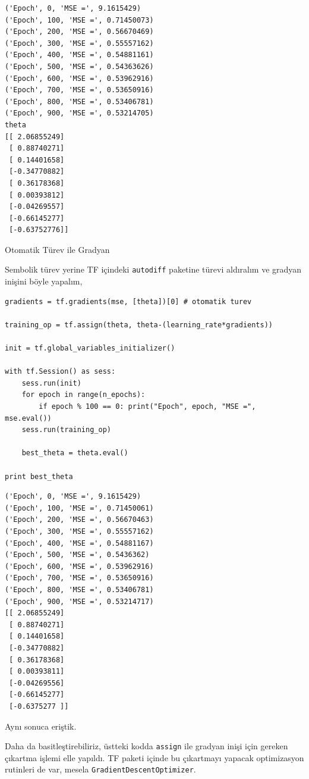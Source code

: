 \documentclass[12pt,fleqn]{article}\usepackage{../../common}
\begin{document}
\begin{verbatim}
('Epoch', 0, 'MSE =', 9.1615429)
('Epoch', 100, 'MSE =', 0.71450073)
('Epoch', 200, 'MSE =', 0.56670469)
('Epoch', 300, 'MSE =', 0.55557162)
('Epoch', 400, 'MSE =', 0.54881161)
('Epoch', 500, 'MSE =', 0.54363626)
('Epoch', 600, 'MSE =', 0.53962916)
('Epoch', 700, 'MSE =', 0.53650916)
('Epoch', 800, 'MSE =', 0.53406781)
('Epoch', 900, 'MSE =', 0.53214705)
theta
[[ 2.06855249]
 [ 0.88740271]
 [ 0.14401658]
 [-0.34770882]
 [ 0.36178368]
 [ 0.00393812]
 [-0.04269557]
 [-0.66145277]
 [-0.63752776]]
\end{verbatim}

Otomatik Türev ile Gradyan

Sembolik türev yerine TF içindeki \verb!autodiff! paketine türevi aldıralım
ve gradyan inişini böyle yapalım,

\begin{verbatim}
gradients = tf.gradients(mse, [theta])[0] # otomatik turev

training_op = tf.assign(theta, theta-(learning_rate*gradients))

init = tf.global_variables_initializer()

with tf.Session() as sess:
    sess.run(init)
    for epoch in range(n_epochs):
        if epoch % 100 == 0: print("Epoch", epoch, "MSE =", mse.eval())
	sess.run(training_op)
    
    best_theta = theta.eval()
    
print best_theta
\end{verbatim}

\begin{verbatim}
('Epoch', 0, 'MSE =', 9.1615429)
('Epoch', 100, 'MSE =', 0.71450061)
('Epoch', 200, 'MSE =', 0.56670463)
('Epoch', 300, 'MSE =', 0.55557162)
('Epoch', 400, 'MSE =', 0.54881167)
('Epoch', 500, 'MSE =', 0.5436362)
('Epoch', 600, 'MSE =', 0.53962916)
('Epoch', 700, 'MSE =', 0.53650916)
('Epoch', 800, 'MSE =', 0.53406781)
('Epoch', 900, 'MSE =', 0.53214717)
[[ 2.06855249]
 [ 0.88740271]
 [ 0.14401658]
 [-0.34770882]
 [ 0.36178368]
 [ 0.00393811]
 [-0.04269556]
 [-0.66145277]
 [-0.6375277 ]]
\end{verbatim}

Aynı sonuca eriştik. 

Daha da basitleştirebiliriz, üstteki kodda \verb!assign! ile gradyan inişi
için gereken çıkartma işlemi elle yapıldı. TF paketi içinde bu çıkartmayı
yapacak optimizasyon rutinleri de var, mesela
\verb!GradientDescentOptimizer!.
\end{document}
